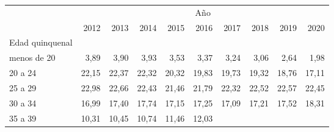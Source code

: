 \begin{tabular}{llllllllll}
\cline{1-10}
\multicolumn{1}{c}{} &
  \multicolumn{9}{|c}{Año} \\
\multicolumn{1}{c}{} &
  \multicolumn{1}{|r}{2012} &
  \multicolumn{1}{r}{2013} &
  \multicolumn{1}{r}{2014} &
  \multicolumn{1}{r}{2015} &
  \multicolumn{1}{r}{2016} &
  \multicolumn{1}{r}{2017} &
  \multicolumn{1}{r}{2018} &
  \multicolumn{1}{r}{2019} &
  \multicolumn{1}{r}{2020} \\
\cline{1-10}
\multicolumn{1}{l}{Edad quinquenal} &
  \multicolumn{1}{|r}{} &
  \multicolumn{1}{r}{} &
  \multicolumn{1}{r}{} &
  \multicolumn{1}{r}{} &
  \multicolumn{1}{r}{} &
  \multicolumn{1}{r}{} &
  \multicolumn{1}{r}{} &
  \multicolumn{1}{r}{} &
  \multicolumn{1}{r}{} \\
\multicolumn{1}{l}{\hspace{1em}menos de 20} &
  \multicolumn{1}{|r}{3,89} &
  \multicolumn{1}{r}{3,90} &
  \multicolumn{1}{r}{3,93} &
  \multicolumn{1}{r}{3,53} &
  \multicolumn{1}{r}{3,37} &
  \multicolumn{1}{r}{3,24} &
  \multicolumn{1}{r}{3,06} &
  \multicolumn{1}{r}{2,64} &
  \multicolumn{1}{r}{1,98} \\
\multicolumn{1}{l}{\hspace{1em}20 a 24} &
  \multicolumn{1}{|r}{22,15} &
  \multicolumn{1}{r}{22,37} &
  \multicolumn{1}{r}{22,32} &
  \multicolumn{1}{r}{20,32} &
  \multicolumn{1}{r}{19,83} &
  \multicolumn{1}{r}{19,73} &
  \multicolumn{1}{r}{19,32} &
  \multicolumn{1}{r}{18,76} &
  \multicolumn{1}{r}{17,11} \\
\multicolumn{1}{l}{\hspace{1em}25 a 29} &
  \multicolumn{1}{|r}{22,98} &
  \multicolumn{1}{r}{22,66} &
  \multicolumn{1}{r}{22,43} &
  \multicolumn{1}{r}{21,46} &
  \multicolumn{1}{r}{21,79} &
  \multicolumn{1}{r}{22,32} &
  \multicolumn{1}{r}{22,52} &
  \multicolumn{1}{r}{22,57} &
  \multicolumn{1}{r}{22,45} \\
\multicolumn{1}{l}{\hspace{1em}30 a 34} &
  \multicolumn{1}{|r}{16,99} &
  \multicolumn{1}{r}{17,40} &
  \multicolumn{1}{r}{17,74} &
  \multicolumn{1}{r}{17,15} &
  \multicolumn{1}{r}{17,25} &
  \multicolumn{1}{r}{17,09} &
  \multicolumn{1}{r}{17,21} &
  \multicolumn{1}{r}{17,52} &
  \multicolumn{1}{r}{18,31} \\
\multicolumn{1}{l}{\hspace{1em}35 a 39} &
  \multicolumn{1}{|r}{10,31} &
  \multicolumn{1}{r}{10,45} &
  \multicolumn{1}{r}{10,74} &
  \multicolumn{1}{r}{11,46} &
  \multicolumn{1}{r}{12,03} &

\end{tabular}
